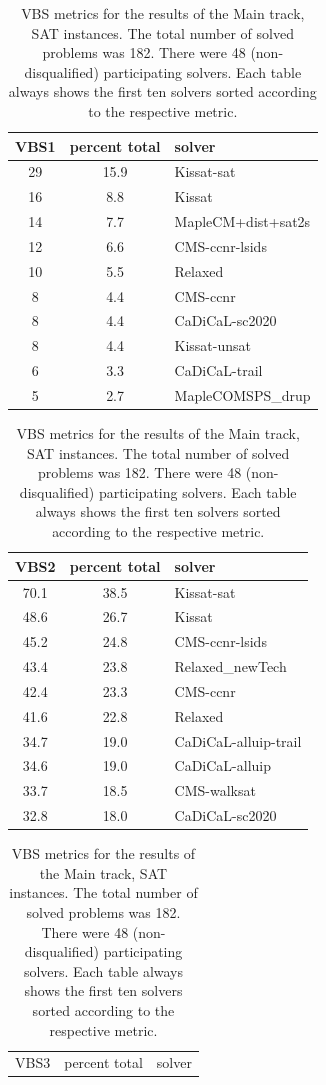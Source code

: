 \documentclass{elsarticle}
\begin{document}
\begin{table}
\caption{VBS metrics for the results of the Main track, SAT instances. 
The total number of solved problems was 182. 
There were 48 (non-disqualified) participating solvers.
Each table always shows the first ten solvers sorted according to the respective metric.}
\label{tab:vbsMainSAT}
\begin{center}
\begin{tabular}{ccl}
VBS1 & percent total & solver \\
\hline
29 & 15.9 & Kissat-sat \\
16 & \phantom{0}8.8 & Kissat \\
14 & \phantom{0}7.7 & MapleCM+dist+sat2s \\
12 & \phantom{0}6.6 & CMS-ccnr-lsids \\
10 & \phantom{0}5.5 & Relaxed \\
\phantom{0}8 & \phantom{0}4.4 & CMS-ccnr \\
\phantom{0}8 & \phantom{0}4.4 & CaDiCaL-sc2020 \\
\phantom{0}8 & \phantom{0}4.4 & Kissat-unsat \\
\phantom{0}6 & \phantom{0}3.3 & CaDiCaL-trail \\
\phantom{0}5 & \phantom{0}2.7 & MapleCOMSPS\_drup \\
\end{tabular}
\end{center}
\begin{center}
\begin{tabular}{ccl}
VBS2 & percent total & solver \\
\hline
70.1 & 38.5 & Kissat-sat \\
48.6 & 26.7 & Kissat \\
45.2 & 24.8 & CMS-ccnr-lsids \\
43.4 & 23.8 & Relaxed\_newTech \\
42.4 & 23.3 & CMS-ccnr \\
41.6 & 22.8 & Relaxed \\
34.7 & 19.0 & CaDiCaL-alluip-trail \\
34.6 & 19.0 & CaDiCaL-alluip \\
33.7 & 18.5 & CMS-walksat \\
32.8 & 18.0 & CaDiCaL-sc2020 \\
\end{tabular}
\end{center}
\begin{center}
\begin{tabular}{ccl}
VBS3 & percent total & solver \\

\end{tabular}
\end{center}
\end{table}
\end{document}
